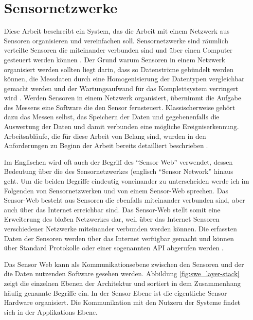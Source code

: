\section{Sensornetzwerke}
Diese Arbeit beschreibt ein System, das die Arbeit mit einem Netzwerk aus Sensoren organisieren und vereinfachen soll. Sensornetzwerke sind räumlich verteilte Sensoren die miteinander verbunden sind und über einen Computer gesteuert werden können \citep{botts_ogc_2008}. Der Grund warum Sensoren in einem Netzwerk organisiert werden sollten liegt darin, dass so Datenströme gebündelt werden können, die Messdaten durch eine Homogenisierung der Datentypen vergleichbar gemacht werden und der Wartungsaufwand für das Komplettsystem verringert wird \citep{resch_standardisierte_2012}\citep{bermudez_ogc_2011}. Werden Sensoren in einem Netzwerk organisiert, übernimmt die Aufgabe des Messens eine Software die den Sensor fernsteuert. Klassischerweise gehört dazu das Messen selbst, das Speichern der Daten und gegebenenfalls die Auswertung der Daten und damit verbunden eine mögliche Ereigniserkennung. Arbeitsabläufe, die für diese Arbeit von Belang sind, wurden in den Anforderungen zu Beginn der Arbeit bereits detailliert beschrieben \citep{golatowski_softwarearchitektur_2003}. 

Im Englischen wird oft auch der Begriff des ``Sensor Web'' verwendet, dessen Bedeutung über die des Sensornetzwerkes (englisch ``Sensor Network'' hinaus geht. Um die beiden Begriffe eindeutig voneinander zu unterscheiden werde ich im Folgenden von Sensornetzwerken und von einem Sensor-Web sprechen. Das Sensor-Web besteht aus Sensoren die ebenfalls miteinander verbunden sind, aber auch über das Internet erreichbar sind. Das Sensor-Web stellt somit eine Erweiterung des bloßen Netzwerkes dar, weil über das Internet Sensoren verschiedener Netzwerke miteinander verbunden werden können. Die erfassten Daten der Sensoren werden über das Internet verfügbar gemacht und können über Standard Protokolle oder einer sogenannten  \gls{API} abgerufen werden \citep{broring_new_2011}\citep{botts_ogc_2008}\citep{guinard_towards_2009}.

Das Sensor Web kann als Kommunikationsebene zwischen den Sensoren und der die Daten nutzenden Software gesehen werden. Abbildung \ref{fig:swe_layer-stack} zeigt die einzelnen Ebenen der Architektur und sortiert in dem Zusammenhang häufig genannte Begriffe ein. In der Sensor Ebene ist die eigentliche Sensor Hardware organisiert. Die Kommunikation mit den Nutzern der Systeme findet sich in der Applikations Ebene.


